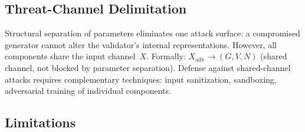 \documentclass[11pt,a4paper]{article}
\theoremstyle{definition}
\begin{document}
\subsection{Threat-Channel Delimitation}

Structural separation of parameters eliminates one attack surface: a compromised generator cannot alter the validator's internal representations. However, all components share the input channel~$X$. Formally: $X_\text{adv} \to (G, V, N)$ (shared channel, not blocked by parameter separation). Defense against shared-channel attacks requires complementary techniques: input sanitization, sandboxing, adversarial training of individual components.

\subsection{Limitations}
\end{document}
